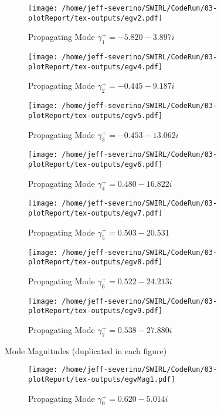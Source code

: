 \documentclass[a4paper]{article}
\begin{document}
 \begin{figure}
     \centering
     \texttt{[image: /home/jeff-severino/SWIRL/CodeRun/03-plotReport/tex-outputs/egv2.pdf]}
     \caption{Propagating Mode $\gamma^+_1 = -5.820-3.897i$}
 \end{figure}


 \begin{figure}
     \centering
     \texttt{[image: /home/jeff-severino/SWIRL/CodeRun/03-plotReport/tex-outputs/egv4.pdf]}
     \caption{Propagating Mode $\gamma^+_2 = -0.445-9.187i$}
 \end{figure}


 \begin{figure}
     \centering
     \texttt{[image: /home/jeff-severino/SWIRL/CodeRun/03-plotReport/tex-outputs/egv5.pdf]}
     \caption{Propagating Mode $\gamma^+_3 = -0.453-13.062i$}
 \end{figure}


 \begin{figure}
     \centering
     \texttt{[image: /home/jeff-severino/SWIRL/CodeRun/03-plotReport/tex-outputs/egv6.pdf]}
     \caption{Propagating Mode $\gamma^+_4 = 0.480 - 16.822i$}
 \end{figure}


 \begin{figure}
     \centering
     \texttt{[image: /home/jeff-severino/SWIRL/CodeRun/03-plotReport/tex-outputs/egv7.pdf]}
     \caption{Propagating Mode $\gamma^+_5 = 0.503 - 20.531$}
 \end{figure}


 \begin{figure}
     \centering
     \texttt{[image: /home/jeff-severino/SWIRL/CodeRun/03-plotReport/tex-outputs/egv8.pdf]}
     \caption{Propagating Mode $\gamma^+_6 = 0.522 - 24.213i$}
 \end{figure}

 \begin{figure}
     \centering
     \texttt{[image: /home/jeff-severino/SWIRL/CodeRun/03-plotReport/tex-outputs/egv9.pdf]}
     \caption{Propagating Mode $\gamma^+_7 = 0.538 - 27.880i$}
 \end{figure}

Mode Magnitudes (duplicated in each figure)


 \begin{figure}
     \centering
     \texttt{[image: /home/jeff-severino/SWIRL/CodeRun/03-plotReport/tex-outputs/egvMag1.pdf]}
     \caption{Propagating Mode $\gamma^+_0 = 0.620-5.014i$}
 \end{figure}
\end{document}
